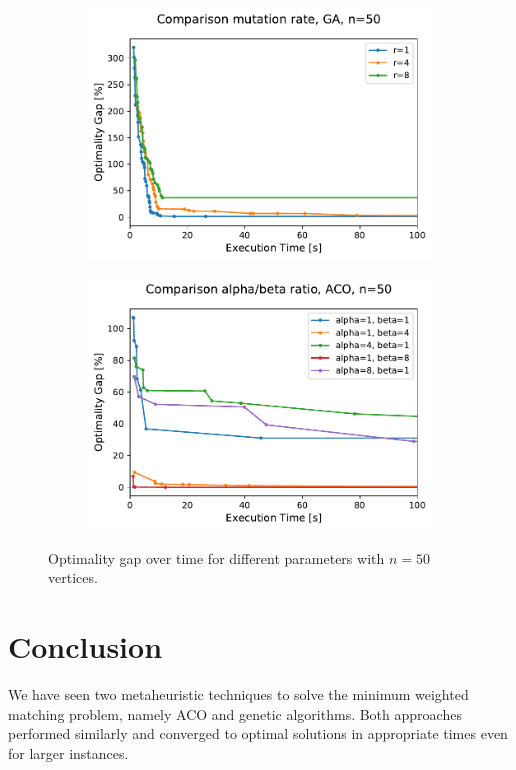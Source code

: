 \documentclass[12pt]{article}
\begin{document}
 \begin{figure}
        \centering
        \begin{subfigure}[b]{0.475\textwidth}
            \centering
            \includegraphics[width=\textwidth]{figures/ga_50_mutation_rate_comparison.pdf}
            \caption%
            {{\small }}    
            \label{fig:mean and std of net14}
        \end{subfigure}
        \hfill
        \begin{subfigure}[b]{0.475\textwidth}  
            \centering 
            \includegraphics[width=\textwidth]{figures/aco_50_alpha_beta_ratio_comparison.pdf}
            \caption%
            {{\small }}     
            \label{fig:mean and std of net24}
        \end{subfigure}
        \caption
        {\small Optimality gap over time for different parameters with $n=50$ vertices. } 
        \label{fig:mean and std of nets}
    \end{figure}

\section{Conclusion}
We have seen two metaheuristic techniques to solve the minimum weighted matching problem, namely ACO and genetic algorithms.
Both approaches performed similarly and converged to optimal solutions in appropriate times even for larger instances.



\end{document}

